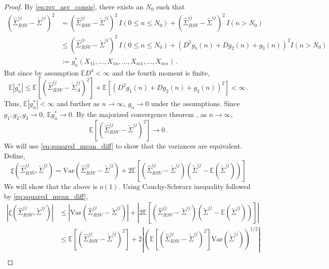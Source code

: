 \documentclass[11pt]{article}
\newcommand{\E}{\mathbb{E}}
\newcommand{\Var}{\text{Var}}
\theoremstyle{remark}
\begin{document}
\begin{proof}
By \eqref{eq:rsv_asv_consis}, there exists an $N_0$ such that
\begin{align*}
\left(\hat{\Sigma}_{RSV}^{ij} - \tilde{\Sigma}^{ij} \right)^2 &= \left(\hat{\Sigma}_{RSV}^{ij} - \tilde{\Sigma}^{ij} \right)^2 \, I(0 \leq n \leq N_0) + \left(\hat{\Sigma}_{RSV}^{ij} - \tilde{\Sigma}^{ij} \right)^2 \, I(n > N_0)\\
& \leq \left(\hat{\Sigma}_{RSV}^{ij} - \tilde{\Sigma}^{ij} \right)^2 \, I(0 \leq n \leq N_0) +  \left(D^2g_1(n) + Dg_2(n) + g_3(n) \right)^2 I(n > N_0)\\
& := g_n^*(X_{11}, \dots, X_{1n}, \dots, X_{m1}, \dots, X_{mn})\,.
\end{align*}
But since by assumption $\E D^4 <\infty$ and the fourth moment is finite,
\[
\E \left| g_n^* \right| \leq  \E \left[\left(\hat{\Sigma}_{RSV}^{ij} - \tilde{\Sigma}_{A}^{ij} \right)^2 \right] + \E \left[\left(D^2g_1(n) + Dg_2(n) + g_3(n) \right)^2 \right] < \infty\,.
\]
Thus, $\E \left| g_n^* \right| < \infty$ and further as $n \to \infty$, $g_n \to 0$ under the assumptions. Since $g_1, g_2, g_3 \to 0$, $\E g_n^* \to 0$. By the majorized convergence theorem \citep{zeid:2013}, as $n \to \infty$,
\begin{equation}
\label{eq:squared_mean_diff}
  \E \left[\left(\hat{\Sigma}_{RSV}^{ij} - \tilde{\Sigma}^{ij} \right)^2 \right] \to 0\,.
\end{equation}
%
We will use \eqref{eq:squared_mean_diff} to show that the variances are equivalent. Define,
\[
\xi\left(\hat{\Sigma}_{RSV}^{ij}, \tilde{\Sigma}^{ij} \right) = \Var\left(\hat{\Sigma}_{RSV}^{ij} - \tilde{\Sigma}^{ij} \right) + 2 \E\left[ \left(\hat{\Sigma}_{RSV}^{ij} -  \tilde{\Sigma}^{ij} \right) \left(\tilde{\Sigma}^{ij}  - \E \left( \tilde{\Sigma}^{ij} \right) \right) \right]
\]
We will show that the above is $o(1)$. Using Cauchy-Schwarz inequality followed by \eqref{eq:squared_mean_diff},
\begin{align*}
\left|  \xi\left(\hat{\Sigma}_{RSV}^{ij}, \tilde{\Sigma}^{ij} \right) \right| & \leq \left| \Var\left(\hat{\Sigma}_{RSV}^{ij} -  \tilde{\Sigma}^{ij} \right) \right| + \left| 2 \E\left[ \left(\hat{\Sigma}_{RSV}^{ij} - \tilde{\Sigma}^{ij} \right) \left(\tilde{\Sigma}^{ij}  - \E \left( \tilde{\Sigma}^{ij} \right) \right) \right]\right| \\ 
& \leq \E\left[\left(\hat{\Sigma}_{RSV}^{ij} -  \tilde{\Sigma}^{ij} \right)^2 \right] + 2 \left| \left(\E\left[ \left(\hat{\Sigma}_{RSV}^{ij} - \tilde{\Sigma}^{ij} \right)^2 \right]  \Var\left(\tilde{\Sigma}^{ij}  \right)   \right)^{1/2}\right| \\ 

\end{align*}
\end{proof}
\end{document}
